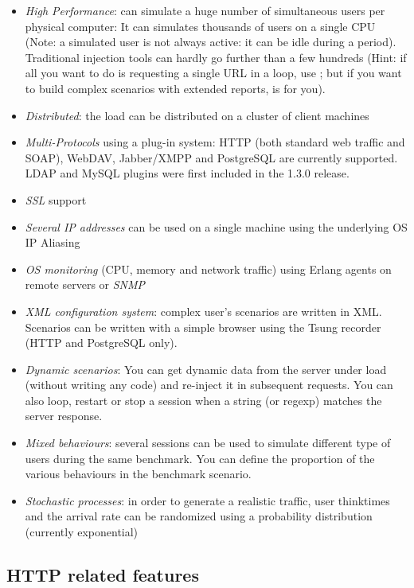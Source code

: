 \documentclass{TSUNG-en}
\begin{document}
\begin{itemize}
\item \emph{High Performance}:  can simulate a
  huge number of simultaneous users per physical computer: It can
  simulates thousands of users on a single CPU (Note: a simulated user
  is not always active: it can be idle during a 
  period). Traditional injection tools can hardly go further than a
  few hundreds (Hint: if all you want to do is requesting a single URL
  in a loop, use ; but if you want to build complex
  scenarios with extended reports,  is for you).
\item \emph{Distributed}: the load can be distributed on a cluster of
client machines
\item \emph{Multi-Protocols} using a plug-in system: HTTP (both standard
web traffic and SOAP),  WebDAV, Jabber/XMPP and PostgreSQL are currently
supported. LDAP and MySQL plugins were first included in the 1.3.0 release.
\item \emph{SSL} support
\item \emph{Several IP addresses} can be used on a single machine using
the underlying OS IP Aliasing
\item \emph{OS monitoring} (CPU, memory and network traffic) using Erlang
agents on remote servers or \emph{SNMP}
\item \emph{XML configuration system}: complex user's scenarios are written
  in XML. Scenarios can be written with a simple browser using the
  Tsung recorder (HTTP and PostgreSQL only).
\item \emph{Dynamic scenarios}: You can get dynamic data from the
  server under load (without writing any code) and re-inject it in
  subsequent requests. You can also loop, restart or stop a
  session when a string (or regexp) matches the server response.
\item \emph{Mixed behaviours}: several sessions can be used to simulate
different type of users during the same benchmark. You can define
the proportion of the various behaviours in the benchmark scenario.
\item \emph{Stochastic processes}: in order to generate a realistic traffic,
user thinktimes and the arrival rate can be randomized using a probability
distribution (currently exponential)
\end{itemize}

\subsection{HTTP related features}
\end{document}
